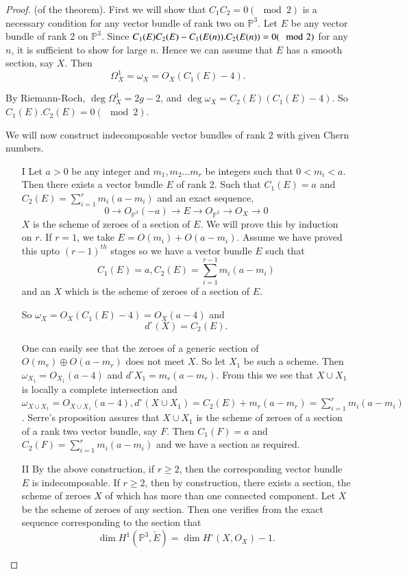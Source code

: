 \begin{proof}
(of the theorem). First we will show that $C_1C_2=0 (\mod 2)$ is a
  necessary condition for any vector bundle of rank two on
  $\mathbb{P}^3$. Let $E$ be any vector bundle of rank 2 on
  $\mathbb{P}^3$. Since $C_1(E)C_2(E)-C_1(E(n)).\break C_2(E(n))=0 (\mod 2)$
  for any $n$, it is sufficient to show for large $n$. Hence we can
  assume that $E$ has a smooth section, say $X$. Then
$$
\Omega_X^1=\omega_X=O_X(C_1(E)-4).
$$

By Riemann-Roch, $\deg\Omega_X^1=2g-2$, and
$\deg\omega_X=C_2(E)(C_1(E)-4)$. So $C_1(E). C_2(E)=0 (\mod 2)$. 

We will now construct indecomposable vector bundles of rank 2 with
given Chern numbers. 
\begin{itemize}
\item [I] Let $a>0$ be any integer and $m_1,m_2\ldots m_r$ be integers
such that $0<m_i<a$. Then there exists a vector bundle $E$ of rank
2. Such that $C_1(E)=a$ and $C_2(E)=\sum\limits_{i=1}^r m_i(a-m_i)$
and an exact sequence,
$$
0\longrightarrow O_{\mathbb{P}^3}(-a)\longrightarrow E\longrightarrow
O_{\mathbb{P}^3}\longrightarrow O_X\longrightarrow 0
$$
\ie $X$ is the scheme of zeroes of a section of $E$. We\pageoriginale
will prove this by induction on $r$. If $r=1$, we take
$E=O(m_i)+O(a-m_i)$. Assume we have proved this upto $(r-1)^{th}$
stages so we have a vector bundle $E$ such that 
$$
C_1(E)=a, C_2(E)=\sum\limits_{i=1}^{r-1}m_i(a-m_i)
$$
and an $X$ which is the scheme of zeroes of a section of $E$.

\noindent So $\omega_X=O_X(C_1(E)-4)=O_X(a-4)$ and 
$$
d^\circ(X)=C_2(E).
$$

One can easily see that the zeroes of a generic section of $O(m_r)
\oplus O(a-m_r)$ does not meet $X$. So let $X_1$ be such a
scheme. Then $\omega_{X_1}=O_{X_1}(a-4)$ and $d^\circ
X_1=m_r(a-m_r)$. From this we see that $X\cup X_1$ is locally a
complete intersection and $\omega_{X\cup X_1}=O_{X\cup X_1}(a-4),
d^\circ(X\cup X_1)=C_2(E)+m_r(a-m_r)=\sum\limits_{i=1}^rm_i
(a-m_i)$. Serre's proposition assures that $X\cup X_1$ is the scheme
of zeroes of a section of a rank two vector bundle, say $F$. Then
$C_1(F)=a$ and $C_2(F)=\sum\limits_{i=1}^rm_i(a-m_i)$ and we have a
section as required. 
\item [II] By the above construction, if $r\geq 2$, then the
  corresponding vector bundle $E$ is indecomposable. If $r\geq 2$,
  then by construction, there exists a section, the scheme of zeroes
  $X$ of which has more than one connected component. Let $X$ be the
  scheme of zeroes of any section. Then one verifies from the exact
  sequence corresponding to the section that 
$$
\dim H^1(\mathbb{P}^3,\check{E})=\dim H^\circ(X,O_X)-1.
$$


\end{itemize}
\end{proof}
